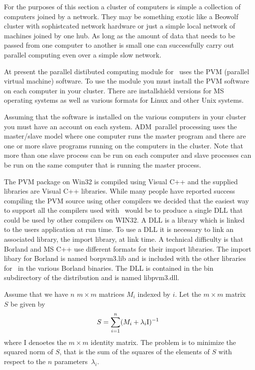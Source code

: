 %
%

\def\kerntwo{\kern -4pt}

For the purposes of this section a cluster of computers is
simple a collection of computers joined by a network. They may be
something exotic like a Beowolf cluster with sophistcated
network hardware or just a simple local network of machines
joined by one hub. As long as the amount of data that needs to be passed
from one computer to another is small one can successfully carry out
parallel computing even over a simple slow network.

At present the parallel distibuted computing module for \ADM\
uses the PVM (parallel virtual machine) software. 
To use the module you must install the PVM software on each computer 
in your cluster. There are installshield versions for MS operating systems
as well as various formats for Linux and other Unix systems.

Assuming that the software is installed on the various computers in your cluster
you must have an account on each system. ADM\ parallel processing
uses the master/slave model where one computer runs the master program and
there are one or more slave programs running on the computers in the
cluster. Note that more than one slave process can be run on each computer
and slave processes can be run on the same computer that is running the
master process.

The PVM package on Win32 is compiled using Visual C++ and
the supplied libraries are Visual C++ libraries. While
many people have reported success compiling the PVM
source using other compilers we decided that the easiest
way to support all the compilers used with \ADM\ would
be to produce a single DLL that could be used by other
compilers on WIN32. A DLL is a library which is linked to
the users application at run time. To use a DLL it is necessary to link
an associated library, the import library, at link time.
A technical difficulty is that Borland and MS C++ use different
formats for their import libraries. The import libary for Borland
is named borpvm3.lib and is included with the other libraries for
\ADM\ in the various Borland binaries. The DLL is contained
in the bin subdirectory of the distribution and is named libpvm3.dll.

Assume that we have $n$ $m\times m$ matrices $M_i$ indexed by $i$.
Let the $m\times m$  matrix $S$ be given by
$$S=\sum_{i=1}^n (M_i+\lambda_i \hbox{\rm I})^{-1}$$
where I denoetes the $m\times m$ identity matrix.
The problem is to minimize the squared norm of $S$, that is the sum of the
squares of the elements of $S$ with respect to the $n$ parameters~$\lambda_i$.

